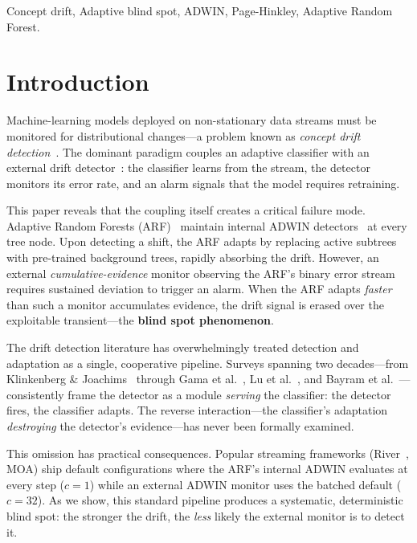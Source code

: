\documentclass[10pt,conference]{IEEEtran}
\theoremstyle{definition}
\begin{document}
\begin{IEEEkeywords}
  Concept drift, Adaptive blind spot, ADWIN, Page-Hinkley, Adaptive Random Forest.
\end{IEEEkeywords}

\section{Introduction}\label{sec:intro}

Machine-learning models deployed on non-stationary data streams must be monitored for distributional changes---a problem known as \emph{concept drift detection}~\cite{gama_survey_2014, lu_concept_drift_2018}.
The dominant paradigm couples an adaptive classifier with an external drift detector~\cite{gomes_arf_2017, bifet_adwin_2007}: the classifier learns from the stream, the detector monitors its error rate, and an alarm signals that the model requires retraining.

This paper reveals that the coupling itself creates a critical failure mode.
Adaptive Random Forests (ARF)~\cite{gomes_arf_2017} maintain internal ADWIN detectors~\cite{bifet_adwin_2007} at every tree node.
Upon detecting a shift, the ARF adapts by replacing active subtrees with pre-trained background trees, rapidly absorbing the drift.
However, an external \emph{cumulative-evidence} monitor observing the ARF's binary error stream requires sustained deviation to trigger an alarm.
When the ARF adapts \emph{faster} than such a monitor accumulates evidence, the drift signal is erased over the exploitable transient---the \textbf{blind spot phenomenon}.

The drift detection literature has overwhelmingly treated detection and adaptation as a single, cooperative pipeline.
Surveys spanning two decades---from Klinkenberg \& Joachims~\cite{klinkenberg_2000} through Gama et al.~\cite{gama_survey_2014}, Lu et al.~\cite{lu_concept_drift_2018}, and Bayram et al.~\cite{bayram_2022}---consistently frame the detector as a module \emph{serving} the classifier: the detector fires, the classifier adapts.
The reverse interaction---the classifier's adaptation \emph{destroying} the detector's evidence---has never been formally examined.

This omission has practical consequences.
Popular streaming frameworks (River~\cite{montiel_river_2021}, MOA) ship default configurations where the ARF's internal ADWIN evaluates at every step ($c = 1$) while an external ADWIN monitor uses the batched default ($c = 32$).
As we show, this standard pipeline produces a systematic, deterministic blind spot: the stronger the drift, the \emph{less} likely the external monitor is to detect it.
\end{document}
